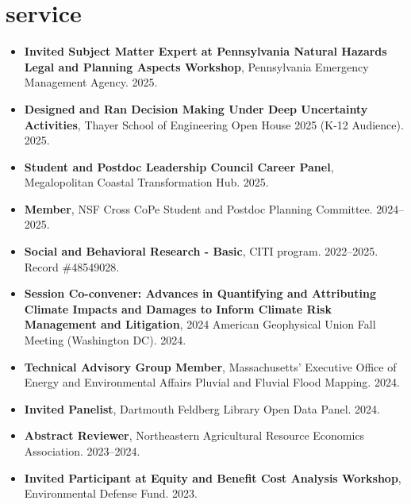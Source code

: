 \documentclass[10pt,oneside]{article}
\begin{document}

\section{service}

\mbox{}\vspace{-\dimexpr\baselineskip\relax}

\begin{itemize}[label={}]
  
  \item \textbf{Invited Subject Matter Expert at Pennsylvania Natural Hazards Legal and Planning Aspects Workshop}, Pennsylvania Emergency Management Agency. 2025.
  
  \item \textbf{Designed and Ran Decision Making Under Deep Uncertainty Activities}, Thayer School of Engineering Open House 2025 (K-12 Audience). 2025.
  
  \item \textbf{Student and Postdoc Leadership Council Career Panel}, Megalopolitan Coastal Transformation Hub. 2025.
  
  \item \textbf{Member}, NSF Cross CoPe Student and Postdoc Planning Committee. 2024--2025.
  
  \item \textbf{Social and Behavioral Research - Basic}, CITI program. 2022--2025.\\Record \#48549028.
  
  \item \textbf{Session Co-convener: Advances in Quantifying and Attributing Climate Impacts and Damages to Inform Climate Risk Management and Litigation}, 2024 American Geophysical Union Fall Meeting (Washington DC). 2024.
  
  \item \textbf{Technical Advisory Group Member}, Massachusetts’ Executive Office of Energy and Environmental Affairs Pluvial and Fluvial Flood Mapping. 2024.
  
  \item \textbf{Invited Panelist}, Dartmouth Feldberg Library Open Data Panel. 2024.
  
  \item \textbf{Abstract Reviewer}, Northeastern Agricultural Resource Economics Association. 2023--2024.
  
  \item \textbf{Invited Participant at Equity and Benefit Cost Analysis Workshop}, Environmental Defense Fund. 2023.
  

\end{itemize}
\end{document}
